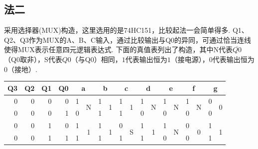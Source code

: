 \documentclass[11pt,UTF8]{ctexart}
\begin{document}
\subsection{法二}
采用选择器(MUX)构造，这里选用的是74HC151，比较起法一会简单得多. Q1、Q2、Q3作为MUX的A、B、C输入，通过比较输出与Q0的异同，可通过恰当连线使得MUX表示任意四元逻辑表达式. 下面的真值表列出了构造，其中N代表$\overline{Q0}$（Q0取非），S代表$Q0$（与Q0）相同，$1$代表输出恒为$1$（接电源），$0$代表输出恒为$0$（接地）.
\begin{table}[H]
  \centering
    \begin{tabular}{|r|r|r|r|r|c|r|c|r|c|r|c|r|c|r|c|r|c|}
    \hline
    \multicolumn{1}{|l|}{Q3} & \multicolumn{1}{l|}{Q2} & \multicolumn{1}{l|}{Q1} & \multicolumn{1}{l|}{Q0} & \multicolumn{2}{c|}{a} & \multicolumn{2}{c|}{b} & \multicolumn{2}{c|}{c} & \multicolumn{2}{c|}{d} & \multicolumn{2}{c|}{e} & \multicolumn{2}{c|}{f} & \multicolumn{2}{c|}{g} \bigstrut\\
    \hline
    0     & 0     & 0     & 0     & \textcolor[rgb]{ 1,  0,  0}{1} & \multirow{2}[4]{*}{N} & \textcolor[rgb]{ 1,  0,  0}{1} & \multirow{2}[4]{*}{1} & \textcolor[rgb]{ 1,  0,  0}{1} & \multirow{2}[4]{*}{1} & \textcolor[rgb]{ 1,  0,  0}{1} & \multirow{2}[4]{*}{N} & \textcolor[rgb]{ 1,  0,  0}{1} & \multirow{2}[4]{*}{N} & \textcolor[rgb]{ 1,  0,  0}{1} & \multirow{2}[4]{*}{N} & 0     & \multirow{2}[4]{*}{0} \bigstrut\\
\cline{1-5}\cline{7-7}\cline{9-9}\cline{11-11}\cline{13-13}\cline{15-15}\cline{17-17}    0     & 0     & 0     & 1     & 0     &       & \textcolor[rgb]{ 1,  0,  0}{1} &       & \textcolor[rgb]{ 1,  0,  0}{1} &       & 0     &       & 0     &       & 0     &       & 0     &  \bigstrut\\
    \hline
    0     & 0     & 1     & 0     & \textcolor[rgb]{ 1,  0,  0}{1} & \multirow{2}[4]{*}{1} & \textcolor[rgb]{ 1,  0,  0}{1} & \multirow{2}[4]{*}{1} & 0     & \multirow{2}[4]{*}{S} & \textcolor[rgb]{ 1,  0,  0}{1} & \multirow{2}[4]{*}{1} & \textcolor[rgb]{ 1,  0,  0}{1} & \multirow{2}[4]{*}{N} & 0     & \multirow{2}[4]{*}{0} & \textcolor[rgb]{ 1,  0,  0}{1} & \multirow{2}[4]{*}{1} \bigstrut\\
\cline{1-5}\cline{7-7}\cline{9-9}\cline{11-11}\cline{13-13}\cline{15-15}\cline{17-17}    0     & 0     & 1     & 1     & \textcolor[rgb]{ 1,  0,  0}{1} &       & \textcolor[rgb]{ 1,  0,  0}{1} &       & \textcolor[rgb]{ 1,  0,  0}{1} &       & \textcolor[rgb]{ 1,  0,  0}{1} &       & 0     &       & 0     &       & \textcolor[rgb]{ 1,  0,  0}{1} &  \bigstrut\\

\end{tabular}
\end{table}
\end{document}
